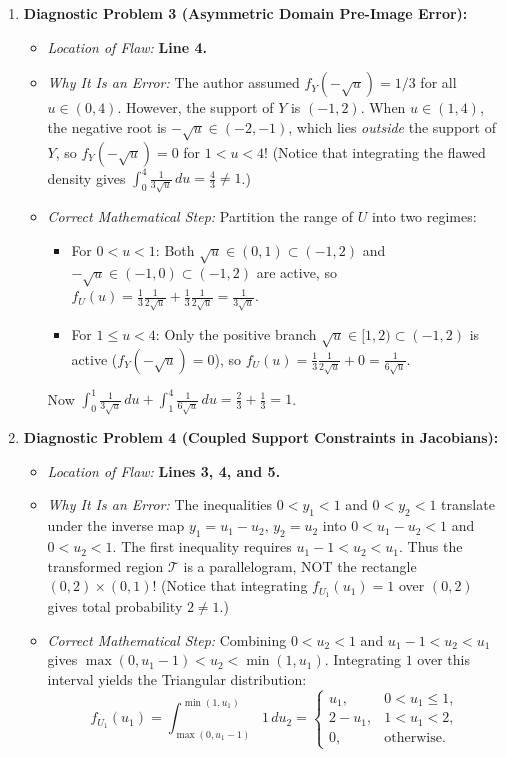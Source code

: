 \documentclass[11pt, letterpaper]{article}
\theoremstyle{definition}
\theoremstyle{remark}
\begin{document}
\begin{enumerate}[label=\textbf{Resolution \arabic*:}]
    \item \textbf{Diagnostic Problem 3 (Asymmetric Domain Pre-Image Error):}
    \begin{itemize}
        \item \emph{Location of Flaw:} \textbf{Line 4.}
        \item \emph{Why It Is an Error:} The author assumed $f_Y(-\sqrt{u}) = 1/3$ for all $u \in (0, 4)$. However, the support of $Y$ is $(-1, 2)$. When $u \in (1, 4)$, the negative root is $-\sqrt{u} \in (-2, -1)$, which lies \emph{outside} the support of $Y$, so $f_Y(-\sqrt{u}) = 0$ for $1 < u < 4$! (Notice that integrating the flawed density gives $\int_0^4 \frac{1}{3\sqrt{u}}\,du = \frac{4}{3} \neq 1$.)
        \item \emph{Correct Mathematical Step:} Partition the range of $U$ into two regimes:
        \begin{itemize}
            \item For $0 < u < 1$: Both $\sqrt{u} \in (0, 1) \subset (-1, 2)$ and $-\sqrt{u} \in (-1, 0) \subset (-1, 2)$ are active, so $f_U(u) = \frac{1}{3}\frac{1}{2\sqrt{u}} + \frac{1}{3}\frac{1}{2\sqrt{u}} = \frac{1}{3\sqrt{u}}$.
            \item For $1 \le u < 4$: Only the positive branch $\sqrt{u} \in [1, 2) \subset (-1, 2)$ is active ($f_Y(-\sqrt{u}) = 0$), so $f_U(u) = \frac{1}{3}\frac{1}{2\sqrt{u}} + 0 = \frac{1}{6\sqrt{u}}$.
        \end{itemize}
        Now $\int_0^1 \frac{1}{3\sqrt{u}}\,du + \int_1^4 \frac{1}{6\sqrt{u}}\,du = \frac{2}{3} + \frac{1}{3} = 1$.
    \end{itemize}

    \item \textbf{Diagnostic Problem 4 (Coupled Support Constraints in Jacobians):}
    \begin{itemize}
        \item \emph{Location of Flaw:} \textbf{Lines 3, 4, and 5.}
        \item \emph{Why It Is an Error:} The inequalities $0 < y_1 < 1$ and $0 < y_2 < 1$ translate under the inverse map $y_1 = u_1 - u_2, \, y_2 = u_2$ into $0 < u_1 - u_2 < 1$ and $0 < u_2 < 1$. The first inequality requires $u_1 - 1 < u_2 < u_1$. Thus the transformed region $\mathcal{T}$ is a parallelogram, NOT the rectangle $(0, 2) \times (0, 1)$! (Notice that integrating $f_{U_1}(u_1) = 1$ over $(0, 2)$ gives total probability $2 \neq 1$.)
        \item \emph{Correct Mathematical Step:} Combining $0 < u_2 < 1$ and $u_1 - 1 < u_2 < u_1$ gives $\max(0, u_1 - 1) < u_2 < \min(1, u_1)$. Integrating $1$ over this interval yields the Triangular distribution:
        \[
            f_{U_1}(u_1) = \int_{\max(0, u_1 - 1)}^{\min(1, u_1)} 1 \, du_2 = \begin{cases} u_1, & 0 < u_1 \le 1, \\ 2 - u_1, & 1 < u_1 < 2, \\ 0, & \text{otherwise.} \end{cases}
        \]
    \end{itemize}


\end{enumerate}
\end{document}
